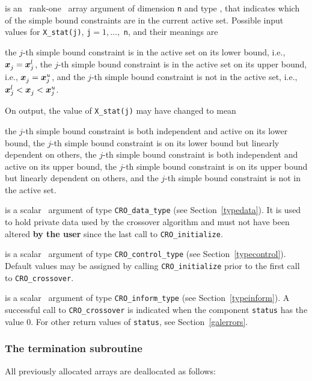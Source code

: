 \documentclass{galahad}
\newcommand{\packagename}{CRO}
\begin{document}
\begin{description}
 is an \intentin\ rank-one \intentinout\ array argument of
dimension {\tt n}
and type \integer, that indicates which of the simple bound
constraints are in the current active set. Possible input values for
{\tt X\_stat(j)}, {\tt j}$=1, \ldots ,$ {\tt n}, and their meanings are
\begin{description}
 the $j$-th simple bound constraint
is in the active set on its lower bound, i.e., ${\bm{x}}_j^{} = {\bm{x}}_j^{l}$,
 the $j$-th simple bound constraint
is in the active set on its upper bound, i.e., ${\bm{x}}_j^{} = {\bm{x}}_j^{u}$,
and
  the $j$-th simple bound constraint is not in the active set,
i.e., ${\bm{x}}_j^{l} < {\bm{x}}_j^{} < {\bm{x}}_j^{u}$.
\end{description}
On output, the value of {\tt X\_stat(j)} may have changed to mean
\begin{description}
 the $j$-th simple bound constraint
is both independent and active on its lower bound,
 the $j$-th simple bound constraint
is on its lower bound but linearly dependent on others,
 the $j$-th simple bound constraint
is both independent and active on its upper bound,
 the $j$-th simple bound constraint
is on its upper bound but linearly dependent on others, and
 the $j$-th simple bound constraint is not in the active set.
\end{description}

 is a scalar \intentinout\ argument of type
{\tt \packagename\_data\_type}
(see Section~\ref{typedata}).
It is used to hold private data used by the crossover algorithm
and must not have been altered {\bf by the user} since the last call to
{\tt \packagename\_initialize}.

 is a scalar \intentin\ argument of type
{\tt \packagename\_control\_type}
(see Section~\ref{typecontrol}). Default values may be assigned by calling
{\tt \packagename\_initialize} prior to the first call to
{\tt \packagename\_crossover}.

 is a scalar \intentinout\ argument of type
{\tt \packagename\_inform\_type}
(see Section~\ref{typeinform}).
A successful call to
{\tt \packagename\_crossover}
is indicated when the  component {\tt status} has the value 0.
For other return values of {\tt status}, see Section~\ref{galerrors}.

\end{description}


\subsubsection{The  termination subroutine}
All previously allocated arrays are deallocated as follows:
\vspace*{1mm}
\end{document}
